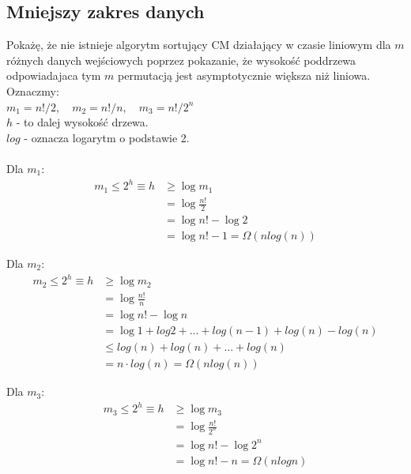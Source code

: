 \documentclass{article}
\begin{document}
\subsection{Mniejszy zakres danych}
Pokażę, że nie istnieje algorytm sortujący CM działający w czasie liniowym dla $m$ różnych danych wejściowych poprzez pokazanie, że wysokość poddrzewa odpowiadajaca tym $m$ permutacją jest asymptotycznie większa niż liniowa.\\
Oznaczmy: \\$m_1 = n!/2, \quad m_2 = n!/n, \quad m_3 = n!/2^{n}$\\ 
$h$ - to dalej wysokość drzewa.\\
$log$ - oznacza logarytm o podstawie 2.\\
\\
Dla $m_1$:
\begin{align*}
m_1 \leq 2^{h} \equiv h &\geq \log m_1 \\&= \log \frac{n!}{2} \\&= \log n! - \log 2 \\&= \log n! - 1 = \Omega(n log (n))
\end{align*}

Dla $m_2$:
\begin{align*}
m_2 \leq 2^{h} \equiv h &\geq \log m_2 \\&= \log \frac{n!}{n} \\&= \log n! - \log n \\&= \log 1 + log 2 + ... + log(n-1) + log(n)  - log(n) \\&\leq log(n) + log(n) + ... + log(n) \\&= n \cdot log(n) = \Omega(n log (n))
\end{align*}

Dla $m_3$:
\begin{align*}
m_3 \leq 2^{h} \equiv h &\geq \log m_3 \\&= \log \frac{n!}{2^{n}} \\&= \log n! - \log 2^{n} \\&= \log n! - n = \Omega(n log n)
\end{align*}
\end{document}
